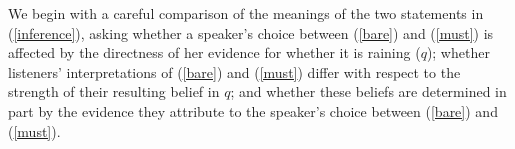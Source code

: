 \documentclass[11pt]{article}
\newcommand{\red}[1]{\textcolor{Red}{#1}}
\begin{document}
We begin with a careful comparison of the meanings of the two statements in (\ref{inference}),
%
%
%
%
%
%
asking whether a speaker's choice between (\ref{bare}) and (\ref{must}) is affected by the directness of her evidence for whether it is raining ($q$); whether listeners' interpretations of  (\ref{bare}) and (\ref{must})  differ with respect to the strength of their resulting belief in $q$; and whether these beliefs are determined in part by the evidence they attribute to the speaker's choice between (\ref{bare}) and (\ref{must}).
\end{document}
